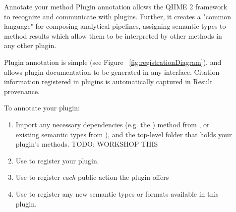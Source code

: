 \documentclass[final]{beamer}
\newlength{\sepwidth}
\newlength{\colwidth}
\newcommand{\separatorcolumn}{\begin{column}{\sepwidth}\end{column}}
\begin{document}
\begin{frame}[t]
\begin{columns}[t]
\begin{column}{\colwidth}
\end{column}

\separatorcolumn

\begin{column}{\colwidth}

\begin{block}{Annotate your method}
  Plugin annotation allows the QIIME 2 framework to recognize and communicate with plugins.
  Further, it creates a "common language" for composing analytical pipelines,
  assigning semantic types to method results which allow them to be interpreted by other
  methods in any other plugin.

  Plugin annotation is simple (see Figure ~\ref{fig:registrationDiagram}), and allows plugin documentation
  to be generated in any interface. Citation information registered in plugins
  is automatically captured in Result provenance.

  To annotate your plugin:

  \begin{enumerate}
    \item Import any necessary dependencies (e.g. the ) method from ,
    or existing semantic types from ), and the top-level folder that holds your plugin's methods. TODO: WORKSHOP THIS
    \item Use  to register your plugin.
    \item Use  to register \textit{each} public action the plugin offers
    \item Use  to register any new semantic types or formats available in this plugin.
  \end{enumerate}

\end{block}


\end{column}
\end{columns}
\end{frame}
\end{document}
